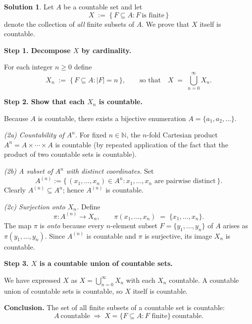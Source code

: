 \documentclass[12pt]{article}
\theoremstyle{definition} %
\newtheorem{solution}{Solution}
\theoremstyle{plain} %
\begin{document}
  \begin{solution}
    Let \(A\) be a countable set and let  
    \[
       X \;:=\;\{\,F\subseteq A : F\ \text{is finite}\,\}
    \]
    denote the collection of \emph{all} finite subsets of \(A\).
    We prove that \(X\) itself is countable.
    
    \bigskip
    \textbf{Step 1.  Decompose \(X\) by cardinality.}
    
    For each integer \(n\ge 0\) define
    \[
       X_{n}\;:=\;\{\,F\subseteq A : |F|=n\,\},
    \qquad
       \text{so that}\quad
       X \;=\;\bigcup_{n=0}^{\infty} X_{n}.
    \]
    
    \bigskip
    \textbf{Step 2.  Show that each \(X_{n}\) is countable.}
    
    Because \(A\) is countable, there exists a bijective enumeration
    \(A=\{a_{1},a_{2},\dots\}\).
    
    \smallskip
    \emph{(2a) Countability of \(A^{n}\).}  
    For fixed \(n\in\mathbb{N}\), the \(n\)-fold Cartesian product
    \(A^{n}=A\times\cdots\times A\) is countable
    (by repeated application of the fact that the product of two countable
    sets is countable).
    
    \smallskip
    \emph{(2b) A subset of \(A^{n}\) with distinct coordinates.}  
    Set
    \[
       A^{(n)}
         :=\{\, (x_{1},\dots,x_{n})\in A^{n} : x_{1},\dots,x_{n}
               \text{ are pairwise distinct}\,\}.
    \]
    Clearly \(A^{(n)}\subseteq A^{n}\); hence \(A^{(n)}\) is countable.
    
    \smallskip
    \emph{(2c) Surjection onto \(X_{n}\).}  
    Define
    \[
       \pi : A^{(n)} \longrightarrow X_{n},
       \qquad
       \pi(x_{1},\dots,x_{n}) \;=\; \{x_{1},\dots,x_{n}\}.
    \]
    The map \(\pi\) is \emph{onto} because every \(n\)-element subset
    \(F=\{y_{1},\dots,y_{n}\}\) of \(A\) arises as
    \(\pi(y_{1},\dots,y_{n})\).
    Since \(A^{(n)}\) is countable and \(\pi\) is surjective,
    its image \(X_{n}\) is countable.
    
    \bigskip
    \textbf{Step 3.  \(X\) is a countable union of countable sets.}
    
    We have expressed \(X\) as  
    \(X=\bigcup_{n=0}^{\infty} X_{n}\)
    with each \(X_{n}\) countable.
    A countable union of countable sets is countable,
    so \(X\) itself is countable.
    
    \bigskip
    \textbf{Conclusion.}
    The set of all finite subsets of a countable set is countable:
    \[
       \boxed{\;
          A\ \text{countable} \;\Longrightarrow\;
          X=\{F\subseteq A : F \text{ finite}\}\ \text{countable}.
       \;}
    \]
    \end{solution}
\end{document}

